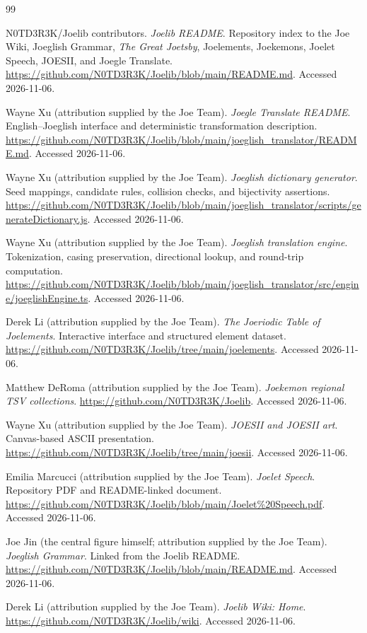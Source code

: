 \documentclass[12pt]{article}
\begin{document}
\clearpage
\begin{thebibliography}{99}
N0TD3R3K/Joelib contributors. \emph{Joelib README}. Repository index to the Joe Wiki, Joeglish Grammar, \emph{The Great Joetsby}, Joelements, Joekemons, Joelet Speech, JOESII, and Joegle Translate. \url{https://github.com/N0TD3R3K/Joelib/blob/main/README.md}. Accessed 2026-11-06.

Wayne Xu (attribution supplied by the Joe Team). \emph{Joegle Translate README}. English--Joeglish interface and deterministic transformation description. \url{https://github.com/N0TD3R3K/Joelib/blob/main/joeglish_translator/README.md}. Accessed 2026-11-06.

Wayne Xu (attribution supplied by the Joe Team). \emph{Joeglish dictionary generator}. Seed mappings, candidate rules, collision checks, and bijectivity assertions. \url{https://github.com/N0TD3R3K/Joelib/blob/main/joeglish_translator/scripts/generateDictionary.js}. Accessed 2026-11-06.

Wayne Xu (attribution supplied by the Joe Team). \emph{Joeglish translation engine}. Tokenization, casing preservation, directional lookup, and round-trip computation. \url{https://github.com/N0TD3R3K/Joelib/blob/main/joeglish_translator/src/engine/joeglishEngine.ts}. Accessed 2026-11-06.

Derek Li (attribution supplied by the Joe Team). \emph{The Joeriodic Table of Joelements}. Interactive interface and structured element dataset. \url{https://github.com/N0TD3R3K/Joelib/tree/main/joelements}. Accessed 2026-11-06.

Matthew DeRoma (attribution supplied by the Joe Team). \emph{Joekemon regional TSV collections}. \url{https://github.com/N0TD3R3K/Joelib}. Accessed 2026-11-06.

Wayne Xu (attribution supplied by the Joe Team). \emph{JOESII and JOESII art}. Canvas-based ASCII presentation. \url{https://github.com/N0TD3R3K/Joelib/tree/main/joesii}. Accessed 2026-11-06.

Emilia Marcucci (attribution supplied by the Joe Team). \emph{Joelet Speech}. Repository PDF and README-linked document. \url{https://github.com/N0TD3R3K/Joelib/blob/main/Joelet\%20Speech.pdf}. Accessed 2026-11-06.

Joe Jin (the central figure himself; attribution supplied by the Joe Team). \emph{Joeglish Grammar}. Linked from the Joelib README. \url{https://github.com/N0TD3R3K/Joelib/blob/main/README.md}. Accessed 2026-11-06.

Derek Li (attribution supplied by the Joe Team). \emph{Joelib Wiki: Home}. \url{https://github.com/N0TD3R3K/Joelib/wiki}. Accessed 2026-11-06.
\end{thebibliography}
\end{document}
